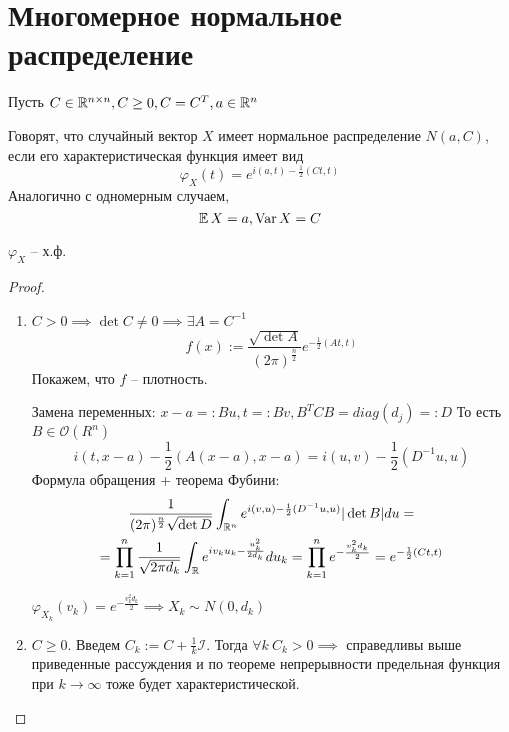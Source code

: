 \section{Многомерное нормальное распределение}
    Пусть $C\in \mathbb{R}^{n \times n}, C \geq 0, C=C^T, a\in \mathbb{R}^n$ 
    \begin{definition}
        Говорят, что случайный вектор $X$ имеет нормальное распределение $N(a, C)$, если его характеристическая функция имеет вид
        \begin{equation*}
            \varphi_X (t) = e^{i(a, t) - \frac{1}{2}(Ct, t)}
        \end{equation*}
        Аналогично с одномерным случаем,
        \begin{equation*}
            \operatorname*{\mathbb{E}} X = a, \operatorname*{Var} X = C
        \end{equation*}
    \end{definition}
    \begin{theorem}
        $\varphi_X$ -- х.ф.
    \end{theorem}
    \begin{proof}
        \begin{enumerate}
            \item $C > 0\implies \det C \neq 0 \implies \exists A = C^{-1}$
            \begin{equation*}
                f(x):=\frac{\sqrt{\det A}}{(2\pi)^{\frac{n}{2}}} e^{-\frac{1}{2}(At, t)}
            \end{equation*}
            Покажем, что $f$ -- плотность.
            
            Замена переменных: $x-a=:Bu, t =: Bv, B^T C B = diag(d_j) =: D$
            То есть $B \in \mathcal{O}(R^n)$
            \begin{equation*}
                i(t, x-a) -\frac{1}{2}(A(x-a), x-a) = i(u, v) - \frac{1}{2} (D^{-1}u, u)
            \end{equation*}
            Формула обращения + теорема Фубини:
            \begin{multline*}
                \frac{1}{(2\pi)^{\frac{n}{2}} \sqrt{\det D}}\int_{\mathbb{R}^n} e^{i(v, u) - \frac{1}{2}(D^{-1}u, u)} |\det B| du = \\ =
                \prod_{k=1}^n \frac{1}{\sqrt{2\pi d_k}} \int_{\mathbb{R}} e^{iv_ku_k - \frac{u_k^2}{2d_k}}du_k = \prod_{k=1}^n e^{-\frac{v_k^2d_k}{2}} = e^{-\frac{1}{2} (Ct, t)}
            \end{multline*}
            \begin{nb}
                $\varphi_{X_k}(v_k) = e^{-\frac{v_k^2d_k}{2}} \implies X_k\sim N(0, d_k)$
            \end{nb}
            \item $C \geq 0$. Введем $C_k := C + \frac{1}{k} \mathcal{I}$. Тогда $\forall k \ C_k > 0 \implies$ справедливы выше приведенные рассуждения и по теореме непрерывности предельная функция при $k\to\infty$ тоже будет характеристической.
        \end{enumerate}
    \end{proof}

